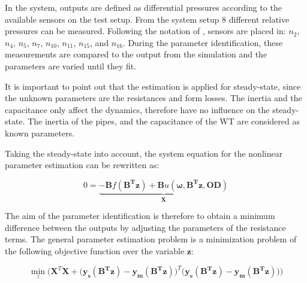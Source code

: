 In the system, outputs are defined as differential pressures according to the available sensors on the test setup. From the system setup $8$ different relative pressures can be measured. Following the notation of , sensors are placed in: 
$n_2$, $n_4$, $n_5$, $n_7$, $n_{10}$, $n_{11}$, $n_{15}$, and  $n_{16}$. During the parameter identification, these measurements are compared to the output from the simulation and the parameters are varied until they fit.

It is important to point out that the estimation is applied for steady-state, since the unknown parameters are the resistances and form losses. The inertia and the capacitance only affect the dynamics, therefore have no influence on the steady-state. The inertia of the pipes, and the capacitance of the WT are considered as known parameters. 

Taking the steady-state into account, the system equation for the nonlinear parameter estimation can be rewritten as: 

\begin{equation}
 0 = \underbrace {-\bm{B} f(\bm{B^T}\bm{z}) + \bm{B} u(\bm{\omega},\bm{B^T}\bm{z},\bm{OD}) }_{\mathcal{\bm{X}}}
 \label{InputOutputmodel_steadystate}
\end{equation}

The aim of the parameter identification is therefore to obtain a minimum difference between the outputs by adjusting the parameters of the resistance terms. The general parameter estimation problem is a minimization problem of the following objective function over the variable $\bm{z}$: 

%
%
 \begin{equation}
 \min_{z} \Big(\mathcal{\bm{X}}^T \mathcal{\bm{X}} + \big(\bm{y_{s}(B^T z)} - \bm{y_{m}(B^T z)} \big)^T  \big(\bm{ y_{s}(B^T z)} - \bm{ y_{m}(B^T z)\big)}\Big)
  \label{ObjectiveFunction11}
 \end{equation}
 
